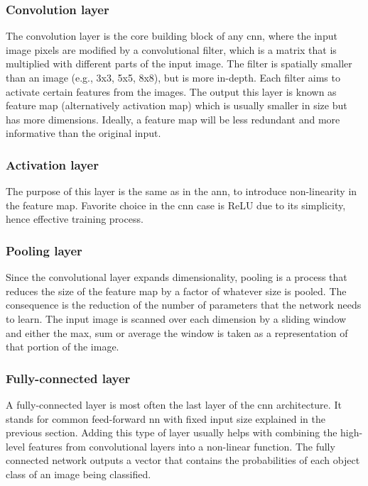        \subsubsection{Convolution layer}
            The convolution layer is the core building block of any \gls{cnn}, where the input image pixels are modified by a convolutional filter, which is a matrix that is multiplied with different parts of the input image. The filter is spatially smaller than an image (e.g., 3x3, 5x5, 8x8), but is more in-depth. Each filter aims to activate certain features from the images. The output this layer is known as feature map (alternatively activation map) which is usually smaller in size but has more dimensions. Ideally, a feature map will be less redundant and more informative than the original input.
            
        \subsubsection{Activation layer}
            The purpose of this layer is the same as in the \gls{ann}, to introduce non-linearity in the feature map. Favorite choice in the \gls{cnn} case is ReLU due to its simplicity, hence effective training process.
            
        \subsubsection{Pooling layer}
            Since the convolutional layer expands dimensionality, pooling is a process that reduces the size of the feature map by a factor of whatever size is pooled. The consequence is the reduction of the number of parameters that the network needs to learn. The input image is scanned over each dimension by a sliding window and either the max, sum or average the window is taken as a representation of that portion of the image. 
            
        \subsubsection{Fully-connected layer}
            A fully-connected layer is most often the last layer of the \gls{cnn} architecture. It stands for common feed-forward \gls{nn} with fixed input size explained in the previous section. Adding this type of layer usually helps with combining the high-level features from convolutional layers into a non-linear function. The fully connected network outputs a vector that contains the probabilities of each object class of an image being classified.


